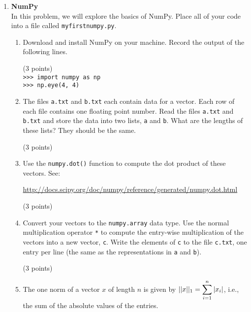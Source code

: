 \documentclass{article}
\newcounter{points}
\newcommand\setpoints[1]{\addtocounter{points}{#1}(#1 points)}
\begin{document}
\begin{enumerate}
\newpage
\item \textbf{NumPy} \\
In this problem, we will explore the basics of NumPy.  Place all of your code into a file called \texttt{myfirstnumpy.py}.

\begin{enumerate}
\item Download and install NumPy on your machine.  Record the output of the following lines.  \setpoints{3} \\
\texttt{>>> import numpy as np} \\
\texttt{>>> np.eye(4, 4)} \\
\end{enumerate}

\begin{enumerate}
\setcounter{enumii}{1}
\item The files \texttt{a.txt} and \texttt{b.txt} each contain data for a vector.  Each row of each file contains one floating point number.  Read the files \texttt{a.txt} and \texttt{b.txt} and store the data into two lists, \texttt{a} and \texttt{b}.  What are the lengths of these lists?  They should be the same.  \setpoints{3}
\end{enumerate}

\begin{enumerate}
\setcounter{enumii}{2}
\item Use the \texttt{numpy.dot()} function to compute the dot product of these vectors.  See:
\begin{center}
\url{http://docs.scipy.org/doc/numpy/reference/generated/numpy.dot.html}
\end{center}
\setpoints{3}
\end{enumerate}

\begin{enumerate}
\setcounter{enumii}{3}
\item Convert your vectors to the \texttt{numpy.array} data type.  Use the normal multiplication operator \texttt{*} to compute the entry-wise multiplication of the vectors into a new vector, \texttt{c}.  Write the elements of \texttt{c} to the file \texttt{c.txt}, one entry per line (the same as the representations in \texttt{a} and \texttt{b}). \setpoints{3}
\end{enumerate}

\begin{enumerate}
\setcounter{enumii}{4}
\item The one norm of a vector $x$ of length $n$ is given by $||x||_1 = \displaystyle\sum\limits_{i=1}^{n} |x_i|$, i.e., the sum of the absolute values of the entries. \\


\end{enumerate}
\end{enumerate}
\end{document}
